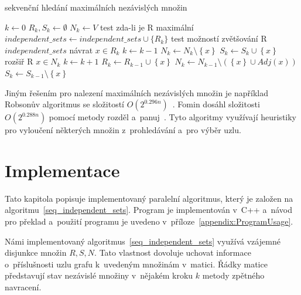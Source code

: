 \documentclass[12pt]{article}
\newcommand{\setHelper}[1]{\left\lbrace #1 \right\rbrace}
\begin{document}
\begin{algorithm}[H]
\caption{sekvenční hledání maximálních nezávislých množin}
\label{seq_independent_sets}
\begin{algorithmic}
\State $k \leftarrow 0$
\State $R_k, S_k \leftarrow \emptyset$
\State $N_k \leftarrow V$
  \State \Comment test zda-li je R maximální                           
    \State $independent\_sets \leftarrow independent\_sets \cup \{R_k\}$
  \EndIf    
  \State \Comment test možností zvětšování R
      \State \Return $independent\_sets$
    \EndIf
    \State \Comment návrat
    \State $x \in R_k$
    \State $k \leftarrow k - 1$
    \State $N_k \leftarrow N_k \setminus \setHelper{x}$
    \State $S_k \leftarrow S_k \cup \setHelper{x}$   
  \Else
    \State \Comment rozšiř R
    \State $x \in N_k$
    \State $k \leftarrow k+1$
    \State $R_k \leftarrow R_{k-1} \cup \setHelper{x}$    
    \State $N_k \leftarrow N_{k-1} \setminus (\setHelper{x} \cup Adj(x))$
    \State $S_k \leftarrow S_{k-1} \setminus \setHelper{x}$     
  \EndIf
\EndWhile
\EndFunction
\end{algorithmic}
\end{algorithm}


Jiným řešením pro nalezení maximálních nezávislých množin je například Robsonův algoritmus se složitostí \(O(2^{0.296n})\)~\cite{robson}. Fomin dosáhl složitosti \(O(2^{0.288n})\) pomocí metody rozděl a~panuj~\cite{fomin}. Tyto algoritmy využívají heuristiky pro vyloučení některých množin z~prohledávání a~pro výběr uzlu.  

\section{Implementace}
Tato kapitola popisuje implementovaný paralelní algoritmus, který je založen na algoritmu~\ref{seq_independent_sets}. Program je implementován v~C++ a~návod pro překlad a~použití programu je uvedeno v~příloze~\ref{appendix:ProgramUsage}.

Námi implementovaný algoritmus~\ref{seq_independent_sets} využívá vzájemné disjunkce množin $R,S,N$. Tato vlastnost dovoluje uchovat informace o~příslušnosti uzlu grafu k~uvedeným množinám v~matici. Řádky matice představují stav nezávislé množiny v~nějakém kroku $k$ metody zpětného navracení. 
                                                           
\end{document}
